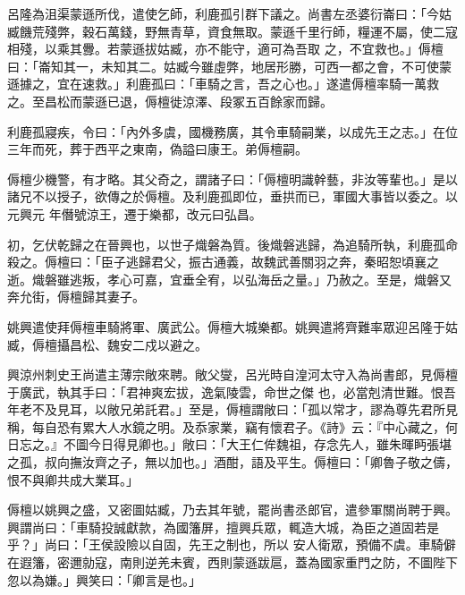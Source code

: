 \begin{pinyinscope}
 呂隆為沮渠蒙遜所伐，遣使乞師，利鹿孤引群下議之。尚書左丞婆衍崙曰：「今姑臧饑荒殘弊，穀石萬錢，野無青草，資食無取。蒙遜千里行師，糧運不屬，使二寇相殘，以乘其釁。若蒙遜拔姑臧，亦不能守，適可為吾取
 之，不宜救也。」傉檀曰：「崙知其一，未知其二。姑臧今雖虛弊，地居形勝，可西一都之會，不可使蒙遜據之，宜在速救。」利鹿孤曰：「車騎之言，吾之心也。」遂遣傉檀率騎一萬救之。至昌松而蒙遜已退，傉檀徙涼澤、段冢五百餘家而歸。



 利鹿孤寢疾，令曰：「內外多虞，國機務廣，其令車騎嗣業，以成先王之志。」在位三年而死，葬于西平之東南，偽謚曰康王。弟傉檀嗣。



 傉檀少機警，有才略。其父奇之，謂諸子曰：「傉檀明識幹藝，非汝等輩也。」是以諸兄不以授子，欲傳之於傉檀。及利鹿孤即位，垂拱而已，軍國大事皆以委之。以元興元
 年僭號涼王，遷于樂都，改元曰弘昌。



 初，乞伏乾歸之在晉興也，以世子熾磐為質。後熾磐逃歸，為追騎所執，利鹿孤命殺之。傉檀曰：「臣子逃歸君父，振古通義，故魏武善關羽之奔，秦昭恕頃襄之逝。熾磐雖逃叛，孝心可嘉，宜垂全宥，以弘海岳之量。」乃赦之。至是，熾磐又奔允街，傉檀歸其妻子。



 姚興遣使拜傉檀車騎將軍、廣武公。傉檀大城樂都。姚興遣將齊難率眾迎呂隆于姑臧，傉檀攝昌松、魏安二戍以避之。



 興涼州刺史王尚遣主薄宗敞來聘。敞父燮，呂光時自湟河太守入為尚書郎，見傉檀于廣武，執其手曰：「君神爽宏拔，逸氣陵雲，命世之傑
 也，必當剋清世難。恨吾年老不及見耳，以敞兄弟託君。」至是，傉檀謂敞曰：「孤以常才，謬為尊先君所見稱，每自恐有累大人水鏡之明。及忝家業，竊有懷君子。《詩》云：『中心藏之，何日忘之。』不圖今日得見卿也。」敞曰：「大王仁侔魏祖，存念先人，雖朱暉眄張堪之孤，叔向撫汝齊之子，無以加也。」酒酣，語及平生。傉檀曰：「卿魯子敬之儔，恨不與卿共成大業耳。」



 傉檀以姚興之盛，又密圖姑臧，乃去其年號，罷尚書丞郎官，遣參軍關尚聘于興。興謂尚曰：「車騎投誠獻款，為國籓屏，擅興兵眾，輒造大城，為臣之道固若是乎？」尚曰：「王侯設險以自固，先王之制也，所以
 安人衛眾，預備不虞。車騎僻在遐籓，密邇勍寇，南則逆羌未賓，西則蒙遜跋扈，蓋為國家重門之防，不圖陛下忽以為嫌。」興笑曰：「卿言是也。」




\end{pinyinscope}
